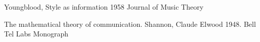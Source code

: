 \documentclass[final,authoryear,11pt,times]{elsarticle}
\begin{document}
Youngblood, Style as information 1958 Journal of Music Theory

The mathematical theory of communication. Shannon, Claude Elwood 1948. Bell Tel Labs Monograph









\end{document}
